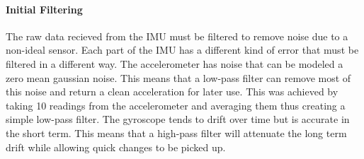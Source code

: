 \documentclass{report}
\begin{document}
\paragraph{Initial Filtering} The raw data recieved from the IMU must be filtered to remove noise due to a non-ideal sensor. Each part of the IMU has a different kind of error that must be filtered in a different way. The accelerometer has noise that can be modeled a zero mean gaussian noise. This means that a low-pass filter can remove most of this noise and return a clean acceleration for later use. This was achieved by taking 10 readings from the accelerometer and averaging them thus creating a simple low-pass filter. The gyroscope tends to drift over time but is accurate in the short term. This means that a high-pass filter will attenuate the long term drift while allowing quick changes to be picked up.
\end{document}
